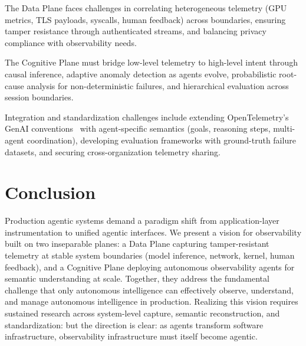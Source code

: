 \documentclass[sigplan,screen,9pt]{acmart}
\begin{document}
The Data Plane faces challenges in correlating heterogeneous telemetry (GPU metrics, TLS payloads, syscalls, human feedback) across boundaries, ensuring tamper resistance through authenticated streams, and balancing privacy compliance with observability needs.

The Cognitive Plane must bridge low-level telemetry to high-level intent through causal inference, adaptive anomaly detection as agents evolve, probabilistic root-cause analysis for non-deterministic failures, and hierarchical evaluation across session boundaries.

Integration and standardization challenges include extending OpenTelemetry's GenAI conventions~\cite{otelgenai,semconv} with agent-specific semantics (goals, reasoning steps, multi-agent coordination), developing evaluation frameworks with ground-truth failure datasets, and securing cross-organization telemetry sharing.

\section{Conclusion}

Production agentic systems demand a paradigm shift from application-layer instrumentation to unified agentic interfaces. We present a vision for observability built on two inseparable planes: a Data Plane capturing tamper-resistant telemetry at stable system boundaries (model inference, network, kernel, human feedback), and a Cognitive Plane deploying autonomous observability agents for semantic understanding at scale. Together, they address the fundamental challenge that only autonomous intelligence can effectively observe, understand, and manage autonomous intelligence in production. Realizing this vision requires sustained research across system-level capture, semantic reconstruction, and standardization: but the direction is clear: as agents transform software infrastructure, observability infrastructure must itself become agentic.




\end{document}
